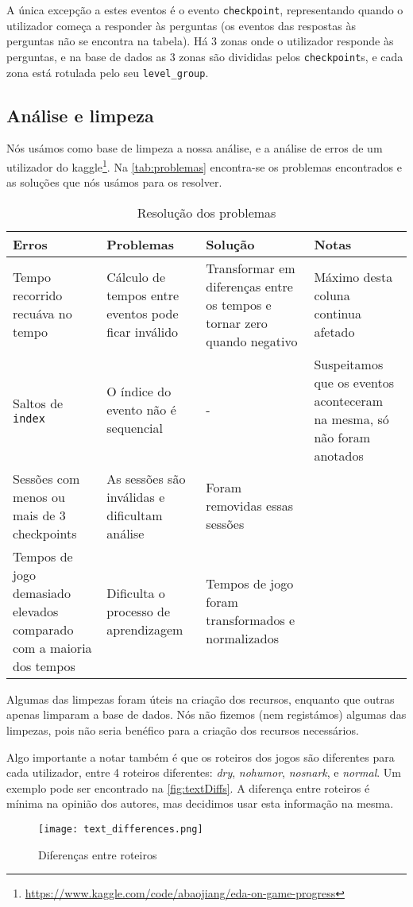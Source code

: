 \documentclass[justified, 11pt]{scrartcl}
\begin{document}
  A única excepção a estes eventos é o evento \texttt{checkpoint}, representando quando o utilizador começa a responder às perguntas (os eventos das respostas às perguntas não se encontra na tabela). Há 3 zonas onde o utilizador responde às perguntas, e na base de dados as 3 zonas são divididas pelos \texttt{checkpoint}s, e cada zona está rotulada pelo seu \texttt{level\_group}.

  \subsection{Análise e limpeza}
  Nós usámos como base de limpeza a nossa análise, e a análise de erros de um utilizador do kaggle\footnote{\url{https://www.kaggle.com/code/abaojiang/eda-on-game-progress}}. Na \autoref{tab:problemas} encontra-se os problemas encontrados e as soluções que nós usámos para os resolver.
  \begin{table}[htb]
    \centering
    \caption{Resolução dos problemas}
    \label{tab:problemas}
    \setlength{\extrarowheight}{7pt}
    \begin{tabulary}{\textwidth}{ L L L L }

      \toprule
      Erros & Problemas & Solução & Notas \\
      \midrule
      Tempo recorrido recuáva no tempo & Cálculo de tempos entre eventos pode ficar inválido & Transformar em diferenças entre os tempos e tornar zero quando negativo & Máximo desta coluna continua afetado \\
      Saltos de \texttt{index} & O índice do evento não é sequencial & - & Suspeitamos que os eventos aconteceram na mesma, só não foram anotados\\
      Sessões com menos ou mais de 3 checkpoints & As sessões são inválidas e dificultam análise & Foram removidas essas sessões & \\
      Tempos de jogo demasiado elevados comparado com a maioria dos tempos & Dificulta o processo de aprendizagem & Tempos de jogo foram transformados e normalizados &
    \end{tabulary}
  \end{table}

  Algumas das limpezas foram úteis na criação dos recursos, enquanto que outras apenas limparam a base de dados. Nós não fizemos (nem registámos) algumas das limpezas, pois não seria benéfico para a criação dos recursos necessários.

  Algo importante a notar também é que os roteiros dos jogos são diferentes para cada utilizador, entre 4 roteiros diferentes: \textit{dry}, \textit{nohumor}, \textit{nosnark}, e \textit{normal}. Um exemplo pode ser encontrado na \autoref{fig:textDiffs}. A diferença entre roteiros é mínima na opinião dos autores, mas decidimos usar esta informação na mesma.
  \begin{figure}[H]
    \centering
    \texttt{[image: text\_differences.png]}
    \caption{Diferenças entre roteiros}
    \label{fig:textDiffs}
  \end{figure}
\end{document}
